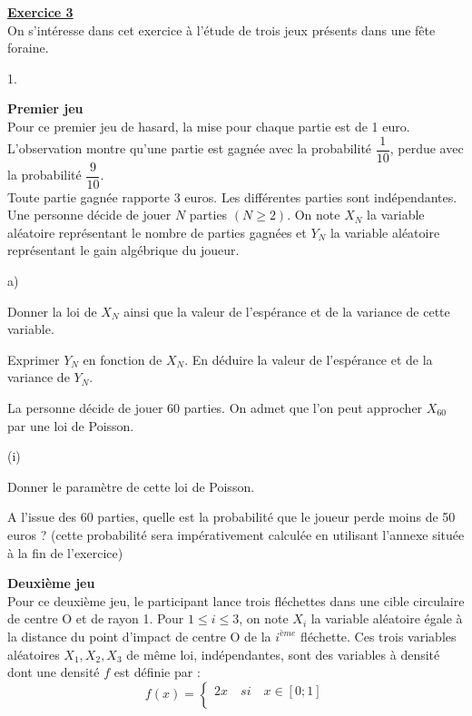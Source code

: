\documentclass[11pt]{article}%
\begin{document}
\underline{\bf Exercice 3}\\
On s'intéresse dans cet exercice à l'étude de trois jeux présents dans
une fête foraine.
\begin{noliste}{1.}
 \setlength{\itemsep}{4mm}
\item {\bf Premier jeu}\\
Pour ce premier jeu de hasard, la mise pour chaque partie est de 1
euro. L'observation montre qu'une partie est gagnée avec la probabilité
$\dfrac{1}{10}$, perdue avec la probabilité $\dfrac{9}{10}$.\\
Toute partie gagnée rapporte 3 euros. Les différentes parties sont
indépendantes.
Une personne décide de jouer $N$ parties $(N\geq 2)$. On note $X_{N}$
la variable aléatoire représentant le nombre de parties gagnées et
$Y_{N}$ la variable aléatoire représentant le gain algébrique du
joueur.
\begin{noliste}{a)}
 \setlength{\itemsep}{2mm}
\item Donner la loi de $X_{N}$ ainsi que la valeur de l'espérance et de
la variance de cette variable.
\item Exprimer $Y_{N}$ en fonction de $X_{N}$. En déduire la valeur de
l'espérance et de la variance de $Y_{N}$.
\item La personne décide de jouer 60 parties. On admet que l'on peut
approcher $X_{60}$ par une loi de Poisson.
\begin{nonoliste}{(i)}
\item Donner le paramètre de cette loi de Poisson.
\item A l'issue des 60 parties, quelle est la probabilité que le joueur
perde moins de 50 euros ? (cette probabilité sera impérativement
calculée en utilisant l'annexe située à la fin de l'exercice)\\
\end{nonoliste}
\end{noliste}
\newpage
\item{\bf Deuxième jeu}\\
Pour ce deuxième jeu, le participant lance trois fléchettes dans une
cible circulaire de centre O et de rayon 1. Pour $1\leq i\leq 3$, on
note $X_{i}$ la variable aléatoire égale à la distance du point
d'impact de centre O de la $i^{ème}$ fléchette. Ces trois variables
aléatoires $X_{1}, X_{2}, X_{3}$ de même loi, indépendantes, sont des
variables à densité dont une densité $f$ est définie par :
\[
f(x) = \left\{ 
\begin{array}{ll}
 2x \quad si \quad x\in [0;1] \\

\end{array}\]
\end{noliste}
\end{document}
